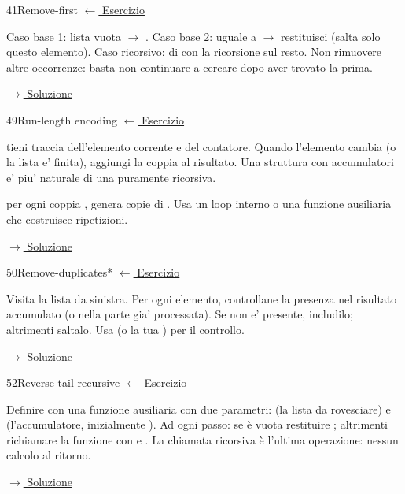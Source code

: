 \label{hint:41}
\begin{hintbox}{41}{Remove-first}
\small\color{black!55}\hyperref[ex:41]{$\leftarrow$ Esercizio}\normalsize\color{black}

Caso base 1: lista vuota $\to$ .
Caso base 2:  uguale a  $\to$ restituisci
 (salta solo questo elemento).
Caso ricorsivo:  di  con la ricorsione
sul resto. Non rimuovere altre occorrenze: basta non continuare
a cercare dopo aver trovato la prima.

\small\color{black!55}\hyperref[sol:41]{$\rightarrow$ Soluzione}\normalsize\color{black}
\end{hintbox}

\label{hint:49}
\begin{hintbox}{49}{Run-length encoding}
\small\color{black!55}\hyperref[ex:49]{$\leftarrow$ Esercizio}\normalsize\color{black}

 tieni traccia dell'elemento corrente e del contatore.
Quando l'elemento cambia (o la lista e' finita), aggiungi
la coppia  al risultato.
Una struttura con accumulatori e' piu' naturale di una
puramente ricorsiva.

 per ogni coppia , genera 
copie di . Usa un loop interno o una funzione ausiliaria
che costruisce  ripetizioni.

\small\color{black!55}\hyperref[sol:49]{$\rightarrow$ Soluzione}\normalsize\color{black}
\end{hintbox}

\label{hint:50}
\begin{hintbox}{50}{Remove-duplicates*}
\small\color{black!55}\hyperref[ex:50]{$\leftarrow$ Esercizio}\normalsize\color{black}

Visita la lista da sinistra. Per ogni elemento, controllane
la presenza nel risultato accumulato (o nella parte gia'
processata). Se non e' presente, includilo; altrimenti saltalo.
Usa  (o la tua ) per il controllo.

\small\color{black!55}\hyperref[sol:50]{$\rightarrow$ Soluzione}\normalsize\color{black}
\end{hintbox}


\label{hint:52}
\begin{hintbox}{52}{Reverse tail-recursive}
\small\color{black!55}\hyperref[ex:52]{$\leftarrow$ Esercizio}\normalsize\color{black}

Definire con  una funzione ausiliaria con due parametri:
 (la lista da rovesciare) e  (l'accumulatore, inizialmente ).
Ad ogni passo: se  è vuota restituire ;
altrimenti richiamare la funzione con  e
.
La chiamata ricorsiva è l'ultima operazione: nessun calcolo al ritorno.

\small\color{black!55}\hyperref[sol:52]{$\rightarrow$ Soluzione}\normalsize\color{black}
\end{hintbox}

